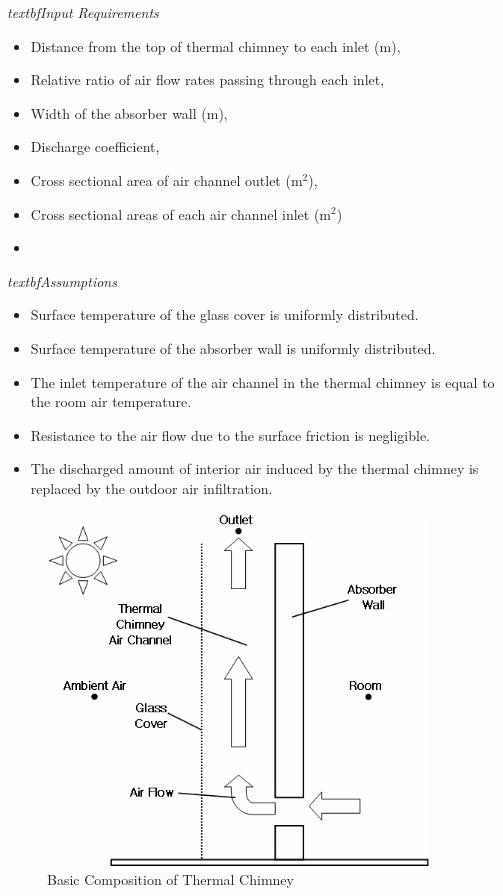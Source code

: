 \emph{textbf{Input Requirements}}

\begin{itemize}
\item
  Distance from the top of thermal chimney to each inlet (m),
\item
  Relative ratio of air flow rates passing through each inlet,
\item
  Width of the absorber wall (m),
\item
  Discharge coefficient,
\item
  Cross sectional area of air channel outlet (m\(^{2}\)),
\item
  Cross sectional areas of each air channel inlet (m\(^{2}\))
\item
\end{itemize}

\emph{textbf{Assumptions}}

\begin{itemize}
\item
  Surface temperature of the glass cover is uniformly distributed.
\item
  Surface temperature of the absorber wall is uniformly distributed.
\item
  The inlet temperature of the air channel in the thermal chimney is equal to the room air temperature.
\item
  Resistance to the air flow due to the surface friction is negligible.
\item
  The discharged amount of interior air induced by the thermal chimney is replaced by the outdoor air infiltration.
\end{itemize}

\begin{figure}[hbtp] %
\centering
\includegraphics[width=0.9\textwidth, height=0.9\textheight, keepaspectratio=true]{media/image7454.png}
\caption{Basic Composition of Thermal Chimney \protect \label{fig:basic-composition-of-thermal-chimney}}
\end{figure}

